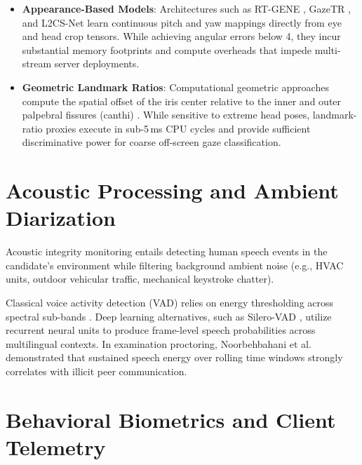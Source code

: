 \begin{itemize}
    \item \textbf{Appearance-Based Models}: Architectures such as RT-GENE \cite{gazeML2018}, GazeTR \cite{cheng2022}, and L2CS-Net \cite{abdelrahman2023} learn continuous pitch and yaw mappings directly from eye and head crop tensors. While achieving angular errors below 4\textdegree, they incur substantial memory footprints and compute overheads that impede multi-stream server deployments.
    \item \textbf{Geometric Landmark Ratios}: Computational geometric approaches compute the spatial offset of the iris center relative to the inner and outer palpebral fissures (canthi) \cite{villanueva2007}. While sensitive to extreme head poses, landmark-ratio proxies execute in sub-5\,ms CPU cycles and provide sufficient discriminative power for coarse off-screen gaze classification.
\end{itemize}

\section{Acoustic Processing and Ambient Diarization}

Acoustic integrity monitoring entails detecting human speech events in the candidate's environment while filtering background ambient noise (e.g., HVAC units, outdoor vehicular traffic, mechanical keystroke chatter). 

Classical voice activity detection (VAD) relies on energy thresholding across spectral sub-bands \cite{webrtc2011}. Deep learning alternatives, such as Silero-VAD \cite{silerovad2021}, utilize recurrent neural units to produce frame-level speech probabilities across multilingual contexts. In examination proctoring, Noorbehbahani et al. \cite{noorbehbahani2022} demonstrated that sustained speech energy over rolling time windows strongly correlates with illicit peer communication.

\section{Behavioral Biometrics and Client Telemetry}

